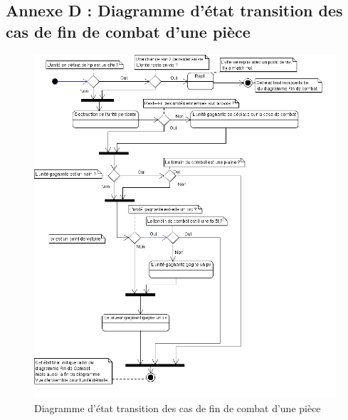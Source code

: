 \subsection{Annexe D : Diagramme d'état transition des cas de fin de combat d'une pièce}
\begin{figure}[!h]
\centering
\includegraphics[width=1\textwidth]{img/FinDeCombat.png}
\caption{Diagramme d'état transition des cas de fin de combat d'une pièce}
\end{figure}
\clearpage

